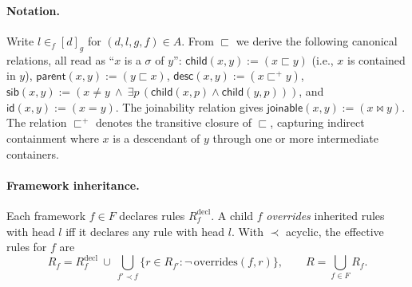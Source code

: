 \documentclass[runningheads,oneside]{llncs}
\begin{document}
\paragraph{Notation.} Write $l\in_f[d]_g$ for $(d,l,g,f)\in A$. From $\sqsubset$ we derive the following canonical relations, all read as ``$x$ is a $\sigma$ of $y$'': $\textsf{child}(x,y) := (x\sqsubset y)$ (i.e., $x$ is contained in $y$), $\textsf{parent}(x,y) := (y\sqsubset x)$, $\textsf{desc}(x,y) := (x\sqsubset^+ y)$, $\textsf{sib}(x,y) := (x\!\ne\! y\ \wedge\ \exists p\,(\textsf{child}(x,p)\wedge \textsf{child}(y,p)))$, and $\textsf{id}(x,y) := (x=y)$. The joinability relation gives $\textsf{joinable}(x,y) := (x \bowtie y)$. The relation $\sqsubset^+$ denotes the transitive closure of $\sqsubset$, capturing indirect containment where $x$ is a descendant of $y$ through one or more intermediate containers.

\paragraph{Framework inheritance.}
Each framework $f\in F$ declares rules $R_f^{\mathrm{decl}}$. A child $f$ \emph{overrides} inherited rules with head $l$ iff it declares any rule with head $l$. With $\prec$ acyclic, the effective rules for $f$ are
\[
R_f = R_f^{\mathrm{decl}}\ \cup\ \bigcup_{f'\prec f}\{r\in R_{f'}:\neg\,\mathrm{overrides}(f,r)\},\qquad
R=\bigcup_{f\in F}R_f.
\]
\end{document}
